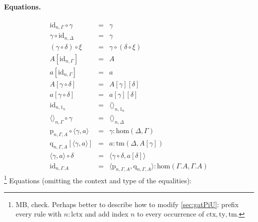 \documentclass[11pt,a4paper]{article}
\theoremstyle{definition}
\newcommand{\id}{\mathsf{id}}
\def\Hom{\mathrm{hom}}
\def\id{\mathrm{id}}
\def\lctx{\mathrm{lctx}}
\newcommand{\ctx}{\mathrm{ctx}}
\newcommand{\ty}{\mathrm{ty}}
\newcommand{\tm}{\mathrm{tm}}
\newcommand{\tuple}[1]{\langle #1 \rangle}
\newcommand{\cext}{.}
\def\p{\mathrm{p}}
\def\q{\mathrm{q}}
\begin{document}
\paragraph{Equations.}
\begin{eqnarray*}
\id_{n,\Gamma} \circ \gamma &=& \gamma \\
 \gamma \circ \id_{n,\Delta} &=& \gamma \\
(\gamma \circ \delta) \circ \xi &=& \gamma \circ (\delta \circ \xi)\\
A[\id_{n,\Gamma}] &=& A 
\\
a[\id_{n,\Gamma}] &=& a%
\\
A[\gamma\circ\delta] &=& A[\gamma][\delta]
\\
a[\gamma\circ\delta] &=& a[\gamma][\delta]
\\
\id_{n,1_n} &=& \tuple{}_{n,1_n} 
\\
\tuple{}_{n,\Gamma}\circ\gamma &=& \tuple{}_{n,\Delta}%
\\
\p_{n,\Gamma,A}\circ\tuple{\gamma,a} &=& \gamma : \Hom(\Delta,\Gamma)\\
\q_{n,\Gamma,A}[\tuple{\gamma,a}] &=& a : \tm(\Delta,A[\gamma]) \\
\tuple{\gamma,a} \circ \delta &=& \tuple{\gamma\circ\delta,a[\delta]} \\
\id_{n,\Gamma\cext A} &=& \tuple{\p_{n,\Gamma,A},\q_{n,\Gamma,A}} : \Hom(\Gamma\cext A,\Gamma\cext A)
\end{eqnarray*}
\footnote{MB, check. Perhaps better to describe how to modify \ref{sec:gatPiU}:
prefix every rule with $n:\lctx$ and add index $n$ to every occurrence
of $\ctx,\ty,\tm$.}
Equations (omitting the context and type of the equalities):
\end{document}
